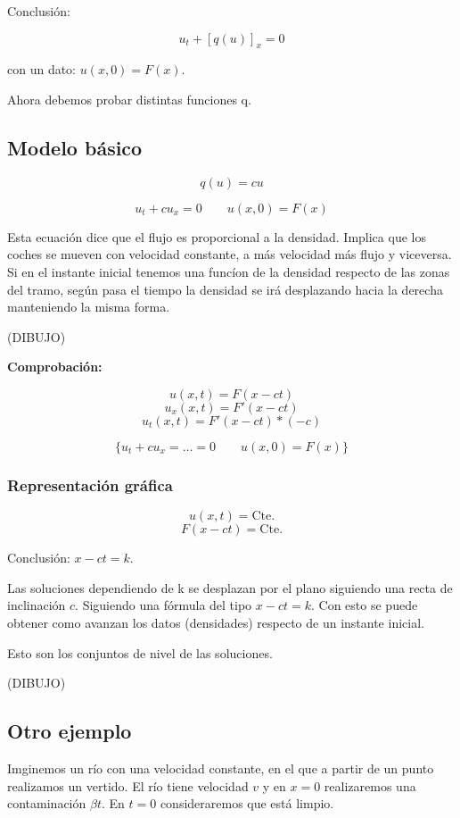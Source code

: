 \documentclass[palatino]{apuntes}
\begin{document}
Conclusión:

$$ u_t + [q(u)]_{x} = 0$$

con un dato: $u(x, 0) = F(x)$.

Ahora debemos probar distintas funciones q.


\subsection{Modelo básico}

$$q(u) = cu$$ 

$$u_t + cu_x = 0 \quad\quad u(x,0) = F(x)$$


Esta ecuación dice que el flujo es proporcional a la densidad. Implica que los coches se mueven con velocidad constante, a más velocidad más flujo y viceversa. Si en el instante inicial tenemos una funcíon de la densidad respecto de las zonas del tramo, según pasa el tiempo la densidad se irá desplazando hacia la derecha manteniendo la misma forma.

(DIBUJO)

\textbf{Comprobación:}

$$ u(x,t) = F(x-ct) $$
$$ u_x(x,t) = F'(x-ct)$$
$$u_t(x,t) = F'(x-ct)*(-c)$$

$$ \{ u_t + cu_x = … = 0 \quad\quad u(x,0) = F(x) \} $$

\subsubsection{Representación gráfica}


$$u(x,t) = \text{Cte.}$$
$$F(x - ct) = \text{Cte.}$$

Conclusión: $x-ct = k$.


Las soluciones dependiendo de k se desplazan por el plano siguiendo una recta de inclinación $c$. Siguiendo una fórmula del tipo $x-ct = k$. Con esto se puede obtener como avanzan los datos (densidades) respecto de un instante inicial.

Esto son los conjuntos de nivel de las soluciones.

(DIBUJO)



\subsection{Otro ejemplo}

Imginemos un río con una velocidad constante, en el que a partir de un punto realizamos un vertido. El río tiene velocidad $v$ y en $x=0$ realizaremos una contaminación $\beta{t}$. En $t=0$ consideraremos que está limpio.
\end{document}
